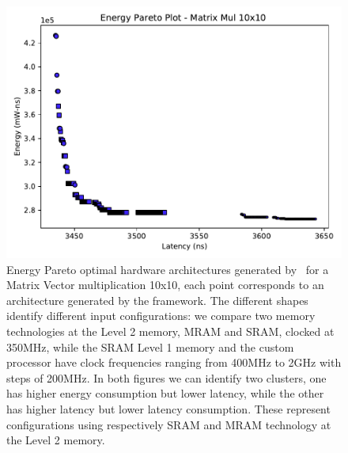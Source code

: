 \begin{figure}[tb] 
\centering
\includegraphics[width=\columnwidth]{graphs/EnergyParetoMatrixMul10.pdf}
    \caption{\small Energy Pareto optimal hardware architectures generated by \frameworkname~for a Matrix Vector multiplication 10x10, each point corresponds to an architecture generated by the framework. The different shapes identify different input configurations: we compare two memory technologies at the Level 2 memory, MRAM and SRAM, clocked at 350MHz, while the SRAM Level 1 memory and the custom processor have clock frequencies ranging from 400MHz to 2GHz with steps of 200MHz. In both figures we can identify two clusters, one has higher energy consumption but lower latency, while the other has higher latency but lower latency consumption. These represent  configurations using respectively SRAM and MRAM technology at the Level 2 memory.}
\label{fig:sram_vs_mram_pareto_mul}
\end{figure}
